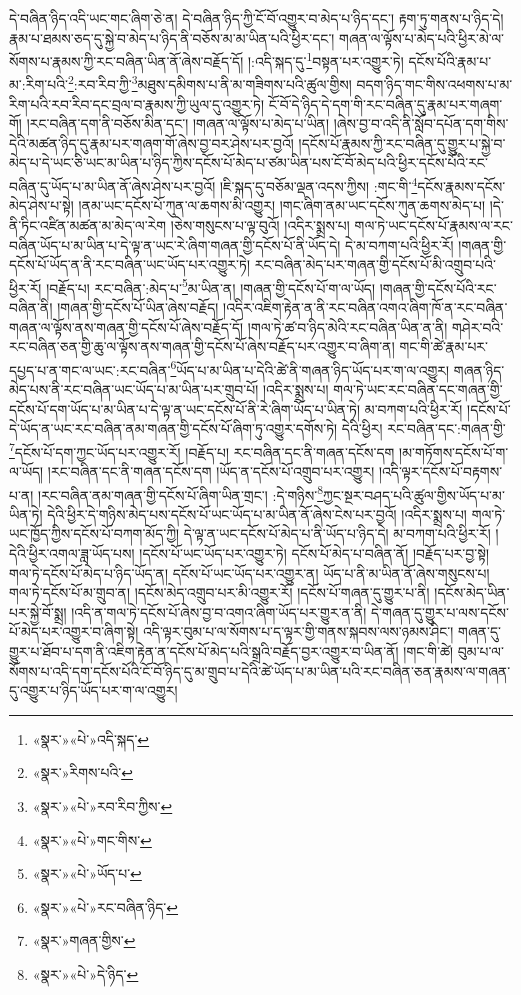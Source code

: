དེ་བཞིན་ཉིད་འདི་ཡང་གང་ཞིག་ཅེ་ན། དེ་བཞིན་ཉིད་ཀྱི་ངོ་བོ་འགྱུར་བ་མེད་པ་ཉིད་དང་། རྟག་ཏུ་གནས་པ་ཉིད་དེ། རྣམ་པ་ཐམས་ཅད་དུ་སྐྱེ་བ་མེད་པ་ཉིད་ནི་བཅོས་མ་མ་ཡིན་པའི་ཕྱིར་དང་། གཞན་ལ་ལྟོས་པ་མེད་པའི་ཕྱིར་མེ་ལ་སོགས་པ་རྣམས་ཀྱི་རང་བཞིན་ཡིན་ནོ་ཞེས་བརྗོད་དོ། །:འདི་སྐད་དུ་\footnote{«སྣར་»«པེ་»འདི་སྐད་}བསྟན་པར་འགྱུར་ཏེ། དངོས་པོའི་རྣམ་པ་མ་:རིག་པའི་\footnote{«སྣར་»རིགས་པའི་}:རབ་རིབ་ཀྱི་\footnote{«སྣར་»«པེ་»རབ་རིབ་ཀྱིས་}མཐུས་དམིགས་པ་ནི་མ་གཟིགས་པའི་ཚུལ་གྱིས། བདག་ཉིད་གང་གིས་འཕགས་པ་མ་རིག་པའི་རབ་རིབ་དང་བྲལ་བ་རྣམས་ཀྱི་ཡུལ་དུ་འགྱུར་ཏེ། ངོ་བོ་དེ་ཉིད་དེ་དག་གི་རང་བཞིན་དུ་རྣམ་པར་གཞག་གོ། །རང་བཞིན་དག་ནི་བཅོས་མིན་དང་། །གཞན་ལ་ལྟོས་པ་མེད་པ་ཡིན། །ཞེས་བྱ་བ་འདི་ནི་སློབ་དཔོན་དག་གིས་དེའི་མཚན་ཉིད་དུ་རྣམ་པར་གཞག་གོ་ཞེས་བྱ་བར་ཤེས་པར་བྱའོ། །དངོས་པོ་རྣམས་ཀྱི་རང་བཞིན་དུ་གྱུར་པ་སྐྱེ་བ་མེད་པ་དེ་ཡང་ཅི་ཡང་མ་ཡིན་པ་ཉིད་ཀྱིས་དངོས་པོ་མེད་པ་ཙམ་ཡིན་པས་ངོ་བོ་མེད་པའི་ཕྱིར་དངོས་པོའི་རང་བཞིན་དུ་ཡོད་པ་མ་ཡིན་ནོ་ཞེས་ཤེས་པར་བྱའོ། །ཇི་སྐད་དུ་བཅོམ་ལྡན་འདས་ཀྱིས། :གང་གི་\footnote{«སྣར་»«པེ་»གང་གིས་}དངོས་རྣམས་དངོས་མེད་ཤེས་པ་སྟེ། །ནམ་ཡང་དངོས་པོ་ཀུན་ལ་ཆགས་མི་འགྱུར། །གང་ཞིག་ནམ་ཡང་དངོས་ཀུན་ཆགས་མེད་པ། །དེ་ནི་ཏིང་འཛིན་མཚན་མ་མེད་ལ་རེག །ཅེས་གསུངས་པ་ལྟ་བུའོ། །འདིར་སྨྲས་པ། གལ་ཏེ་ཡང་དངོས་པོ་རྣམས་ལ་རང་བཞིན་ཡོད་པ་མ་ཡིན་པ་དེ་ལྟ་ན་ཡང་རེ་ཞིག་གཞན་གྱི་དངོས་པོ་ནི་ཡོད་དེ། དེ་མ་བཀག་པའི་ཕྱིར་རོ། །གཞན་གྱི་དངོས་པོ་ཡོད་ན་ནི་རང་བཞིན་ཡང་ཡོད་པར་འགྱུར་ཏེ། རང་བཞིན་མེད་པར་གཞན་གྱི་དངོས་པོ་མི་འགྲུབ་པའི་ཕྱིར་རོ། །བརྗོད་པ། རང་བཞིན་:མེད་པ་\footnote{«སྣར་»«པེ་»ཡོད་པ་}མ་ཡིན་ན། །གཞན་གྱི་དངོས་པོ་ག་ལ་ཡོད། །གཞན་གྱི་དངོས་པོའི་རང་བཞིན་ནི། །གཞན་གྱི་དངོས་པོ་ཡིན་ཞེས་བརྗོད། །འདིར་འཇིག་རྟེན་ན་ནི་རང་བཞིན་འགའ་ཞིག་ཁོ་ན་རང་བཞིན་གཞན་ལ་ལྟོས་ནས་གཞན་གྱི་དངོས་པོ་ཞེས་བརྗོད་དོ། །གལ་ཏེ་ཚ་བ་ཉིད་མེའི་རང་བཞིན་ཡིན་ན་ནི། གཤེར་བའི་རང་བཞིན་ཅན་གྱི་ཆུ་ལ་ལྟོས་ནས་གཞན་གྱི་དངོས་པོ་ཞེས་བརྗོད་པར་འགྱུར་བ་ཞིག་ན། གང་གི་ཚེ་རྣམ་པར་དཔྱད་པ་ན་གང་ལ་ཡང་:རང་བཞིན་\footnote{«སྣར་»«པེ་»རང་བཞིན་ཉིད་}ཡོད་པ་མ་ཡིན་པ་དེའི་ཚེ་ནི་གཞན་ཉིད་ཡོད་པར་ག་ལ་འགྱུར། གཞན་ཉིད་མེད་པས་ནི་རང་བཞིན་ཡང་ཡོད་པ་མ་ཡིན་པར་གྲུབ་པོ། །འདིར་སྨྲས་པ། གལ་ཏེ་ཡང་རང་བཞིན་དང་གཞན་གྱི་དངོས་པོ་དག་ཡོད་པ་མ་ཡིན་པ་དེ་ལྟ་ན་ཡང་དངོས་པོ་ནི་རེ་ཞིག་ཡོད་པ་ཡིན་ཏེ། མ་བཀག་པའི་ཕྱིར་རོ། །དངོས་པོ་དེ་ཡོད་ན་ཡང་རང་བཞིན་ནམ་གཞན་གྱི་དངོས་པོ་ཞིག་ཏུ་འགྱུར་དགོས་ཏེ། དེའི་ཕྱིར། རང་བཞིན་དང་:གཞན་གྱི་\footnote{«སྣར་»གཞན་གྱིས་}དངོས་པོ་དག་ཀྱང་ཡོད་པར་འགྱུར་རོ། །བརྗོད་པ། རང་བཞིན་དང་ནི་གཞན་དངོས་དག །མ་གཏོགས་དངོས་པོ་ག་ལ་ཡོད། །རང་བཞིན་དང་ནི་གཞན་དངོས་དག །ཡོད་ན་དངོས་པོ་འགྲུབ་པར་འགྱུར། །འདི་ལྟར་དངོས་པོ་བརྟགས་པ་ན། །རང་བཞིན་ནམ་གཞན་གྱི་དངོས་པོ་ཞིག་ཡིན་གྲང་། :དེ་གཉིས་\footnote{«སྣར་»«པེ་»དེ་ཉིད་}ཀྱང་སྔར་བཤད་པའི་ཚུལ་གྱིས་ཡོད་པ་མ་ཡིན་ཏེ། དེའི་ཕྱིར་དེ་གཉིས་མེད་པས་དངོས་པོ་ཡང་ཡོད་པ་མ་ཡིན་ནོ་ཞེས་ངེས་པར་བྱའོ། །འདིར་སྨྲས་པ། གལ་ཏེ་ཡང་ཁྱོད་ཀྱིས་དངོས་པོ་བཀག་མོད་ཀྱི། དེ་ལྟ་ན་ཡང་དངོས་པོ་མེད་པ་ནི་ཡོད་པ་ཉིད་དེ། མ་བཀག་པའི་ཕྱིར་རོ། །དེའི་ཕྱིར་འགལ་ཟླ་ཡོད་པས། །དངོས་པོ་ཡང་ཡོད་པར་འགྱུར་ཏེ། དངོས་པོ་མེད་པ་བཞིན་ནོ། །བརྗོད་པར་བྱ་སྟེ། གལ་ཏེ་དངོས་པོ་མེད་པ་ཉིད་ཡོད་ན། དངོས་པོ་ཡང་ཡོད་པར་འགྱུར་ན། ཡོད་པ་ནི་མ་ཡིན་ནོ་ཞེས་གསུངས་པ། གལ་ཏེ་དངོས་པོ་མ་གྲུབ་ན། །དངོས་མེད་འགྲུབ་པར་མི་འགྱུར་རོ། །དངོས་པོ་གཞན་དུ་གྱུར་པ་ནི། །དངོས་མེད་ཡིན་པར་སྐྱེ་བོ་སྨྲ། །འདི་ན་གལ་ཏེ་དངོས་པོ་ཞེས་བྱ་བ་འགའ་ཞིག་ཡོད་པར་གྱུར་ན་ནི། དེ་གཞན་དུ་གྱུར་པ་ལས་དངོས་པོ་མེད་པར་འགྱུར་བ་ཞིག་སྟེ། འདི་ལྟར་བུམ་པ་ལ་སོགས་པ་ད་ལྟར་གྱི་གནས་སྐབས་ལས་ཉམས་ཤིང་། གཞན་དུ་གྱུར་པ་ཐོབ་པ་དག་ནི་འཇིག་རྟེན་ན་དངོས་པོ་མེད་པའི་སྒྲའི་བརྗོད་བྱར་འགྱུར་བ་ཡིན་ནོ། །གང་གི་ཚེ། བུམ་པ་ལ་སོགས་པ་འདི་དག་དངོས་པོའི་ངོ་བོ་ཉིད་དུ་མ་གྲུབ་པ་དེའི་ཚེ་ཡོད་པ་མ་ཡིན་པའི་རང་བཞིན་ཅན་རྣམས་ལ་གཞན་དུ་འགྱུར་པ་ཉིད་ཡོད་པར་ག་ལ་འགྱུར། 